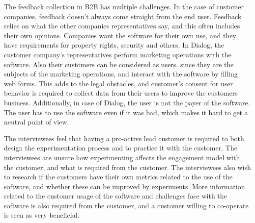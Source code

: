 \documentclass[english, grading]{tktltiki2}
\theoremstyle{definition}
\theoremstyle{remark}
\begin{document}
The feedback collection in B2B has multiple challenges. In the case of customer companies, feedback doesn't always come straight from the end user. Feedback relies on what the other companies representatives say, and this often includes their own opinions. Companies want the software for their own use, and they have requirements for property rights, security and others. In Dialog, the customer company's representatives perform marketing operations with the software. Also their customers can be considered as users, since they are the subjects of the marketing operations, and interact with the software by filling web forms. This adds to the legal obstacles, and customer's consent for user behavior is required to collect data from their users to improve the customers business. Additionally, in case of Dialog, the user is not the payer of the software. The user has to use the software even if it was bad, which makes it hard to get a neutral point of view. 

The interviewees feel that having a pro-active lead customer is required to both design the experimentation process and to practice it with the customer. The interviewees are unsure how experimenting affects the engagement model with the customer, and what is required from the customer. The interviewees also wish to research if the customers have their own metrics related to the use of the software, and whether these can be improved by experiments. More information related to the customer usage of the software and challenges face with the software is also required from the customer, and a customer willing to co-operate is seen as very beneficial. 
\end{document}
